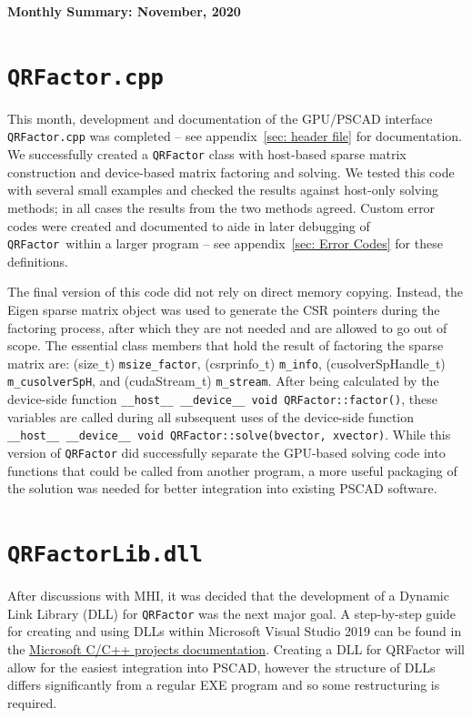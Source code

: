 \documentclass[11pt,letterpaper]{article}
\newcommand{\qrf}{\texttt{QRFactor}}
\begin{document}
\begin{center}
    {\Large \bf Monthly Summary: November, 2020}
\end{center}

\section*{\texttt{QRFactor.cpp}}

This month, development and documentation of the GPU/PSCAD interface \verb+QRFactor.cpp+ was completed -- see appendix~\ref{sec: header file} for documentation. We successfully created a \qrf\! class with host-based sparse matrix construction and device-based matrix factoring and solving. We tested this code with several small examples and checked the results against host-only solving methods; in all cases the results from the two methods agreed. Custom error codes were created and documented to aide in later debugging of \qrf~within a larger program -- see appendix~\ref{sec: Error Codes} for these definitions.

The final version of this code did not rely on direct memory copying. Instead, the Eigen sparse matrix object was used to generate the CSR pointers during the factoring process, after which they are not needed and are allowed to go out of scope. The essential class members that hold the result of factoring the sparse matrix are: (size\verb+_+t) \verb+msize_factor+, (csrprinfo\verb+_+t) \verb+m_info+, (cusolverSpHandle\verb+_+t) \verb+m_cusolverSpH+, and (cudaStream\verb+_+t) \verb+m_stream+. After being calculated by the device-side function \verb+__host__ __device__ void QRFactor::factor()+, these variables are called during all subsequent uses of the device-side function \verb+__host__ __device__ void QRFactor::solve(bvector, xvector)+. While this version of \qrf\! did successfully separate the GPU-based solving code into functions that could be called from another program, a more useful packaging of the solution was needed for better integration into existing PSCAD software.

\section*{\texttt{QRFactorLib.dll}}

After discussions with MHI, it was decided that the development of a Dynamic Link Library (DLL) for \qrf\! was the next major goal. A step-by-step guide for creating and using DLLs within Microsoft Visual Studio 2019 can be found in the \href{https://docs.microsoft.com/en-us/cpp/build/walkthrough-creating-and-using-a-dynamic-link-library-cpp?view=msvc-160#see-also}{Microsoft C/C++ projects documentation}. Creating a DLL for QRFactor will allow for the easiest integration into PSCAD, however the structure of DLLs differs significantly from a regular EXE program and so some restructuring is required. 
\end{document}
